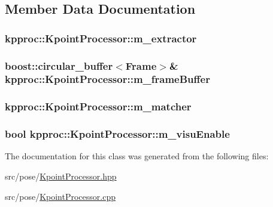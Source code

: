 \subsection{Member Data Documentation}
\subsubsection[{\texorpdfstring{m\+\_\+extractor}{m_extractor}}]{ kpproc\+::\+Kpoint\+Processor\+::m\+\_\+extractor}\hypertarget{classkpproc_1_1KpointProcessor_a5ae3277154dd03cddf303d3be6bb37f7}{}\label{classkpproc_1_1KpointProcessor_a5ae3277154dd03cddf303d3be6bb37f7}
\subsubsection[{\texorpdfstring{m\+\_\+frame\+Buffer}{m_frameBuffer}}]{\setlength{\rightskip}{0pt plus 5cm}boost\+::circular\+\_\+buffer$<${\bf Frame}$>$\& kpproc\+::\+Kpoint\+Processor\+::m\+\_\+frame\+Buffer}\hypertarget{classkpproc_1_1KpointProcessor_a7faab52da545a233fab6ec061338393e}{}\label{classkpproc_1_1KpointProcessor_a7faab52da545a233fab6ec061338393e}
\subsubsection[{\texorpdfstring{m\+\_\+matcher}{m_matcher}}]{ kpproc\+::\+Kpoint\+Processor\+::m\+\_\+matcher}\hypertarget{classkpproc_1_1KpointProcessor_a188352f2093e636cbb06114b4ac7288a}{}\label{classkpproc_1_1KpointProcessor_a188352f2093e636cbb06114b4ac7288a}
\subsubsection[{\texorpdfstring{m\+\_\+visu\+Enable}{m_visuEnable}}]{\setlength{\rightskip}{0pt plus 5cm}bool kpproc\+::\+Kpoint\+Processor\+::m\+\_\+visu\+Enable\hspace{0.3cm}{\ttfamily [private]}}\hypertarget{classkpproc_1_1KpointProcessor_ac521fd8cfc2400004e729fc504209232}{}\label{classkpproc_1_1KpointProcessor_ac521fd8cfc2400004e729fc504209232}


The documentation for this class was generated from the following files\+:\begin{DoxyCompactItemize}
\item 
src/pose/\hyperlink{KpointProcessor_8hpp}{Kpoint\+Processor.\+hpp}\item 
src/pose/\hyperlink{KpointProcessor_8cpp}{Kpoint\+Processor.\+cpp}\end{DoxyCompactItemize}
